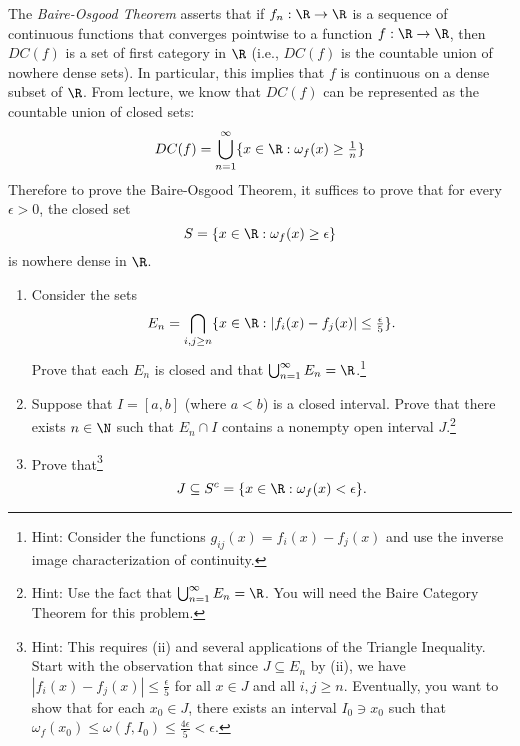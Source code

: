 \documentclass{homework}
\begin{document}
\begin{Exercise}
	The \emph{Baire-Osgood Theorem} asserts that if $f_n:\R\to\R$ is a
  sequence of continuous functions that converges pointwise to a
  function $f:\R\to\R$, then $DC(f)$ is a set of first category in
  $\R$ (i.e., $DC(f)$ is the countable union of nowhere dense sets).
  In particular, this implies that $f$ is continuous on a dense subset
  of $\R$.  From lecture, we know that $DC(f)$ can be represented as
  the countable union of closed sets:
	\begin{equation*}
		DC(f) = \bigcup_{n=1}^{\infty}
    \{x\in \R: \omega_f(x) \geq \tfrac{1}{n} \}
	\end{equation*}
	Therefore to prove the Baire-Osgood Theorem, it suffices to prove
  that for every $\epsilon > 0$, the closed set
	\begin{equation*}
		S = \{x \in \R : \omega_f(x) \geq \epsilon\}
	\end{equation*}
	is nowhere dense in $\R$.
	\begin{enumerate}
  \item  Consider the sets
    \begin{equation*}
      E_n = \bigcap_{i,j \geq n}\{ x \in \R :
      |f_i(x) - f_j(x)| \leq \tfrac{\epsilon}{5} \}.
    \end{equation*}
    Prove that each $E_n$ is closed and that
    $\bigcup_{n=1}^{\infty} E_n =\R$.\footnote{Hint: Consider the
      functions $g_{ij}(x) = f_i(x) - f_j(x)$ and use the inverse
      image characterization of continuity.}

    \begin{solution}

    \end{solution}

  \item Suppose that $I = [a,b]$ (where $a<b$) is a closed interval.
    Prove that there exists $n \in \N$ such that $E_n \cap I$
    contains a nonempty open interval $J$.\footnote{Hint: Use the
      fact that $\bigcup_{n=1}^{\infty} E_n =\R$.  You will need the
      Baire Category Theorem for this problem.}

    \begin{solution}

    \end{solution}

  \item Prove that\footnote{Hint: This requires (ii) and several
      applications of the Triangle Inequality.  Start with the
      observation that since $J \subseteq E_n$ by (ii), we have
      $|f_i(x) - f_j(x)| \leq \tfrac{\epsilon}{5}$ for all $x \in J$
      and all $i,j \geq n$.  Eventually, you want to show that for
      each $x_0 \in J$, there exists an interval $I_0 \ni x_0$ such
      that
      $\omega_f(x_0) \leq \omega(f, I_0) \leq \tfrac{4\epsilon}{5} <
      \epsilon$. }
    \begin{equation*}
      J \subseteq S^c = \{x \in \R : \omega_f(x) < \epsilon\}.
    \end{equation*}


\end{enumerate}
\end{Exercise}
\end{document}

